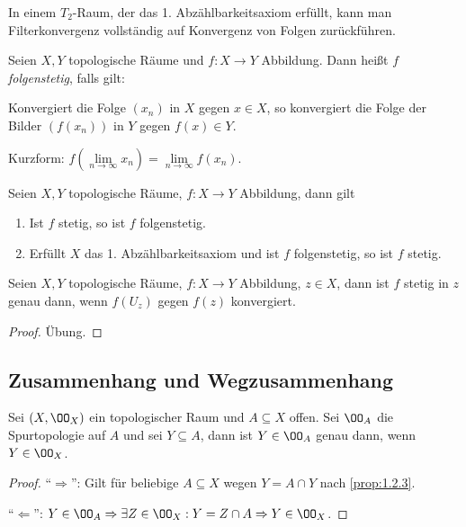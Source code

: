 \begin{bemn}
In einem $T_2$-Raum, der das 1. Abzählbarkeitsaxiom erfüllt, kann man
Filterkonvergenz vollständig auf Konvergenz von Folgen zurückführen.\maphere
\end{bemn}

\begin{defn}
\label{defn:2.1.15}
Seien $X,Y$ topologische Räume und $f: X\to Y$ Abbildung. Dann heißt $f$
\emph{folgenstetig}, falls gilt:

Konvergiert die Folge $(x_n)$ in $X$ gegen $x\in X$, so konvergiert die Folge
der Bilder $(f(x_n))$ in $Y$ gegen $f(x)\in Y$.

Kurzform: $f\left(\lim\limits_{n\to\infty} x_n\right) =
\lim\limits_{n\to\infty} f(x_n)$.\fishhere
\end{defn}

\begin{prop}
\label{prop:2.1.16}
Seien $X,Y$ topologische Räume, $f: X\to Y$ Abbildung, dann gilt
\begin{enumerate}[label=\arabic{*}.)]
  \item Ist $f$ stetig, so ist $f$ folgenstetig.
  \item Erfüllt $X$ das 1. Abzählbarkeitsaxiom und ist $f$ folgenstetig, so ist
  $f$ stetig.\fishhere
\end{enumerate}
\end{prop}


\begin{prop}
Seien $X,Y$ topologische Räume, $f: X\to Y$ Abbildung, $z\in X$, dann ist $f$
stetig in $z$ genau dann, wenn $f(U_z)$ gegen $f(z)$ konvergiert.\fishhere
\end{prop}
\begin{proof}
Übung.\qedhere
\end{proof}


\subsection{Zusammenhang und Wegzusammenhang}
\begin{prop}
\label{prop:2.2.1}
Sei $(X,\OO_X)$ ein topologischer Raum und $A\subseteq X$ offen. Sei
$\OO_A$ die Spurtopologie auf $A$ und sei $Y\subseteq A$, dann ist $Y\in\OO_A$
genau dann, wenn $Y\in\OO_X$.\fishhere
\end{prop}
\begin{proof}
``$\Rightarrow$'': Gilt für beliebige $A\subseteq X$ wegen $Y=A\cap Y$ nach
\ref{prop:1.2.3}.

``$\Leftarrow$'': $Y\in\OO_A\Rightarrow\exists Z\in\OO_X : Y = Z\cap A
\Rightarrow Y\in\OO_X$.\qedhere
\end{proof}

